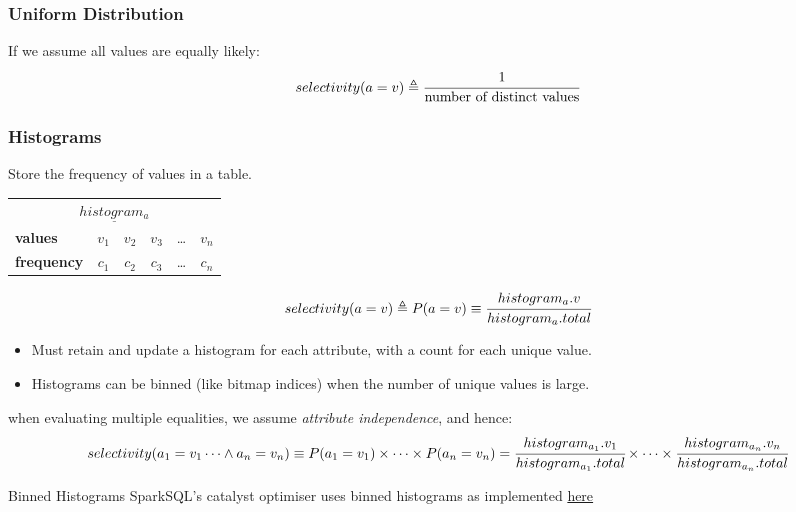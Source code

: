 \subsubsection{Uniform Distribution}
If we assume all values are equally likely:
\[selectivity(a = v) \triangleq \cfrac{1}{\text{number of distinct values}}\]


\subsubsection{Histograms}
Store the frequency of values in a table.
\begin{center}
    \begin{minipage}{.49\textwidth}
        \begin{center}
            \begin{tabular}{l c c c c c}
                \multicolumn{6}{c}{$\underline{histogram_a}$} \\
                \textbf{values}    & $v_1$ & $v_2$ & $v_3$ & \dots & $v_n$ \\ 
                \textbf{frequency} & $c_1$ & $c_2$ & $c_3$ & \dots & $c_n$ \\    
            \end{tabular}
        \end{center}
    \end{minipage} \hfill \begin{minipage}{.49\textwidth}
        \[selectivity(a = v) \triangleq P(a = v) \equiv \cfrac{histogram_a.v}{histogram_a.total} \]
    \end{minipage}
\end{center}
\begin{itemize}
    \item Must retain and update a histogram for each attribute, with a count for each unique value.
    \item Histograms can be binned (like bitmap indices) when the number of unique values is large.
\end{itemize}
when evaluating multiple equalities, we assume \textit{attribute independence}, and hence:
\[selectivity(a_1 = v_1  \dots \land a_n = v_n) \equiv P(a_1 = v_1) \times \dots \times P(a_n = v_n) = \cfrac{histogram_{a_1}.v_1}{histogram_{a_1}.total} \times \dots \times \cfrac{histogram_{a_n}.v_n}{histogram_{a_n}.total}\]

\begin{sidenotebox}{Binned Histograms}
    SparkSQL's catalyst optimiser uses binned histograms as implemented \href{https://github.com/apache/spark/blob/master/sql/catalyst/src/main/scala/org/apache/spark/sql/catalyst/plans/logical/Statistics.scala}{here}
\end{sidenotebox}

